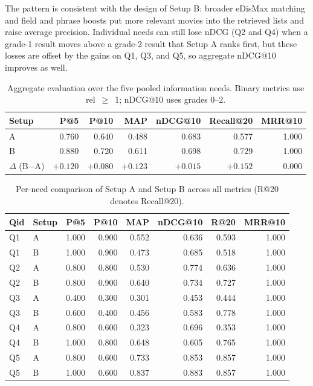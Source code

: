 \documentclass[sigconf]{acmart}
\begin{document}
The pattern is consistent with the design of Setup B: broader eDisMax matching and
field and phrase boosts put more relevant movies into the retrieved lists and raise
average precision. Individual needs can still lose nDCG (Q2 and Q4) when a grade-1
result moves above a grade-2 result that Setup A ranks first, but these losses are
offset by the gains on Q1, Q3, and Q5, so aggregate nDCG@10 improves as well. 

\begin{table}[t]
\centering
\caption{Aggregate evaluation over the five pooled information needs. Binary metrics
use rel~$\geq$~1; nDCG@10 uses grades 0--2.}
\label{tab:evaluation-aggregate}
\small
\setlength{\tabcolsep}{3pt}
\begin{tabular}{lrrrrrr}
\hline
Setup & P@5 & P@10 & MAP & nDCG@10 & Recall@20 & MRR@10 \\
\hline
A & 0.760 & 0.640 & 0.488 & 0.683 & 0.577 & 1.000 \\
B & 0.880 & 0.720 & 0.611 & 0.698 & 0.729 & 1.000 \\
\hline
$\Delta$ (B$-$A) & $+0.120$ & $+0.080$ & $+0.123$ & $+0.015$ & $+0.152$ & $0.000$ \\
\hline
\end{tabular}
\end{table}

\begin{table}[t]
\centering
\caption{Per-need comparison of Setup A and Setup B across all metrics (R@20 denotes
Recall@20).}
\label{tab:evaluation-per-query}
\footnotesize
\setlength{\tabcolsep}{3pt}
\begin{tabular}{llrrrrrr}
\hline
Qid & Setup & P@5 & P@10 & MAP & nDCG@10 & R@20 & MRR@10 \\
\hline
Q1 & A & 1.000 & 0.900 & 0.552 & 0.636 & 0.593 & 1.000 \\
Q1 & B & 1.000 & 0.900 & 0.473 & 0.685 & 0.518 & 1.000 \\
\hline
Q2 & A & 0.800 & 0.800 & 0.530 & 0.774 & 0.636 & 1.000 \\
Q2 & B & 0.800 & 0.900 & 0.640 & 0.734 & 0.727 & 1.000 \\
\hline
Q3 & A & 0.400 & 0.300 & 0.301 & 0.453 & 0.444 & 1.000 \\
Q3 & B & 0.600 & 0.400 & 0.456 & 0.583 & 0.778 & 1.000 \\
\hline
Q4 & A & 0.800 & 0.600 & 0.323 & 0.696 & 0.353 & 1.000 \\
Q4 & B & 1.000 & 0.800 & 0.648 & 0.605 & 0.765 & 1.000 \\
\hline
Q5 & A & 0.800 & 0.600 & 0.733 & 0.853 & 0.857 & 1.000 \\
Q5 & B & 1.000 & 0.600 & 0.837 & 0.883 & 0.857 & 1.000 \\
\hline
\end{tabular}
\end{table}
\end{document}
